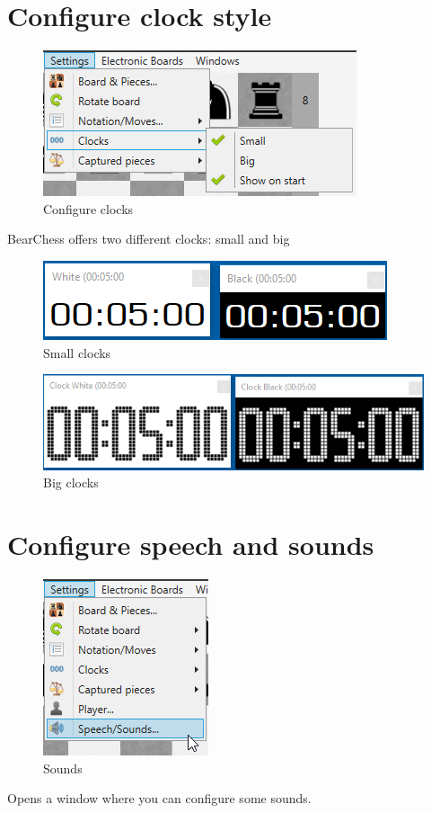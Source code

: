 \documentclass[11pt,a4paper]{article}
\begin{document}
	\section{Configure clock style}
	\begin{figure}[H]
		\centering
		\includegraphics[scale=1.0]{ConfigureClocks.png}
		\caption{Configure clocks }
		\label{fig:ConfigureClocks}
	\end{figure}
	
	BearChess offers two different clocks: small and big
	
	\begin{figure}[H]
		\centering
		\includegraphics[scale=1.0]{SmallClocks.png}
		\caption{Small clocks }
		\label{fig:SmallClocks}
	\end{figure}
	\begin{figure}[H]
		\centering
		\includegraphics[scale=0.8]{BigClocks.png}
		\caption{Big clocks }
		\label{fig:BigClocks}
	\end{figure}
	
	\section{Configure speech and sounds}
	
	\begin{figure}[H]
		\centering
		\includegraphics[scale=1.0]{Sounds2.png}
		\caption{Sounds }
		\label{fig:Sounds2}
	\end{figure}
	Opens a window where you can configure some sounds.
	
\end{document}
